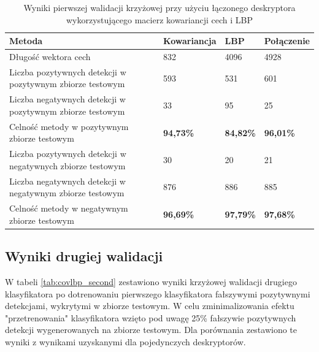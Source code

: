 \begin{center}
    \begin{longtable}{ | p{5cm} | p{3cm} | p{3cm} | p{3cm} |}
    \caption{Wyniki pierwszej walidacji krzyżowej przy użyciu łączonego deskryptora wykorzystującego macierz kowariancji cech i LBP}
    \label{tab:covlbp_first}\\
    \hline
	Metoda & Kowariancja & LBP & Połączenie \\ \hline
    Długość wektora cech & 832 & 4096 & 4928 \\ \hline
    Liczba pozytywnych detekcji w pozytywnym zbiorze testowym & 593 & 531 & 601 \\ \hline
    Liczba negatywnych detekcji w pozytywnym zbiorze testowym & 33 & 95 & 25 \\ \hline
    Celność metody w pozytywnym zbiorze testowym & \textbf{94,73\%} & \textbf{84,82\%} & \textbf{96,01\%} \\ \hline
    Liczba pozytywnych detekcji w negatywnych zbiorze testowym & 30 & 20 & 21 \\ \hline
    Liczba negatywnych detekcji w negatywnym zbiorze testowym & 876 & 886 & 885 \\ \hline
    Celność metody w negatywnym zbiorze testowym & \textbf{96,69\%} & \textbf{97,79\%} & \textbf{97,68\%} \\ \hline
    
    \end{longtable}
\end{center}


\subsection{Wyniki drugiej walidacji}
W tabeli \ref{tab:covlbp_second} zestawiono wyniki krzyżowej walidacji drugiego klasyfikatora po dotrenowaniu pierwszego klasyfikatora fałszywymi pozytywnymi detekcjami, wykrytymi w zbiorze testowym. W celu zminimalizowania efektu "przetrenowania" klasyfikatora wzięto pod uwagę 25\% fałszywie pozytywnych detekcji wygenerowanych na zbiorze testowym. Dla porównania zestawiono te wyniki z wynikami uzyskanymi dla pojedynczych deskryptorów.

